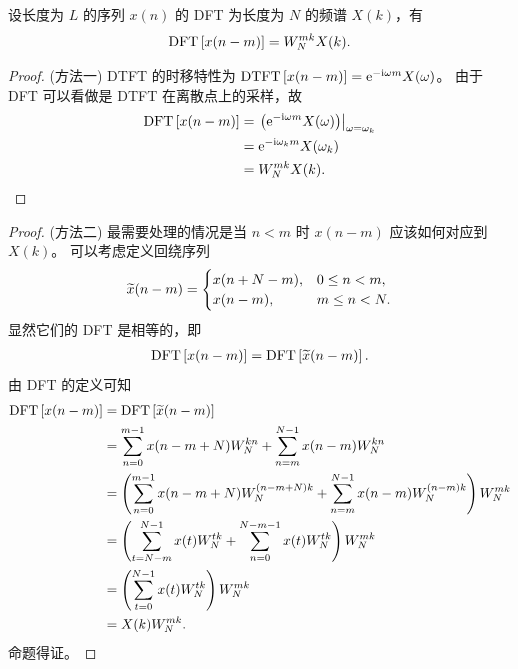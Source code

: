 \begin{property}
    设长度为 $L$ 的序列 $x(n)$ 的 DFT 为长度为 $N$ 的频谱 $X(k)$，有
    \begin{align*}
        \mathrm{DFT}\left[x(n - m)\right] = W_N^{mk}X(k).
    \end{align*}
\end{property}

\begin{proof}
    (方法一)
    DTFT 的时移特性为 $\mathrm{DTFT}\left[x(n - m)\right] = \mathrm{e}^{-\mathrm{i}\omega m}X(\omega)$。
    由于 DFT 可以看做是 DTFT 在离散点上的采样，故
    \begin{align*}
        \mathrm{DFT}\left[x(n - m)\right] & = \left.\left(\mathrm{e}^{-\mathrm{i}\omega m}X(\omega)\right)\right|_{\omega = \omega_k} \\
        & = \mathrm{e}^{-\mathrm{i}\omega_k m}X(\omega_k) \\
        & = W_N^{mk}X(k).
    \end{align*}
\end{proof}

\begin{proof}
    (方法二)
    最需要处理的情况是当 $n < m$ 时 $x(n - m)$ 应该如何对应到 $X(k)$。
    可以考虑定义回绕序列
    \begin{align*}
        \widetilde{x}(n - m) = \begin{cases}
            x(n + N - m), & 0 \le n < m, \\
            x(n - m), & m \le n < N.
        \end{cases}
    \end{align*}
    显然它们的 DFT 是相等的，即
    \begin{align*}
        \mathrm{DFT}\left[x(n - m)\right] = \mathrm{DFT}\left[\widetilde{x}(n - m)\right].
    \end{align*}
    由 DFT 的定义可知
    \begin{align*}
        \mathrm{DFT}\left[x(n - m)\right] & = \mathrm{DFT}\left[\widetilde{x}(n - m)\right] \\
        & = \sum_{n = 0}^{m - 1}x(n - m + N)W_N^{kn}
            + \sum_{n = m}^{N - 1}x(n - m)W_N^{kn} \\
        & = \left(\sum_{n = 0}^{m - 1}x(n - m + N)W_N^{(n - m + N)k}
            + \sum_{n = m}^{N - 1}x(n - m)W_N^{(n - m)k}\right)W_N^{mk} \\
        & = \left(\sum_{t = N - m}^{N - 1}x(t)W_N^{tk}
            + \sum_{n = 0}^{N - m - 1}x(t)W_N^{tk}\right)W_N^{mk} \\
        & = \left(\sum_{t = 0}^{N - 1}x(t)W_N^{tk}\right)W_N^{mk} \\
        & = X(k)W_N^{mk}. 
    \end{align*}
    命题得证。
\end{proof}

